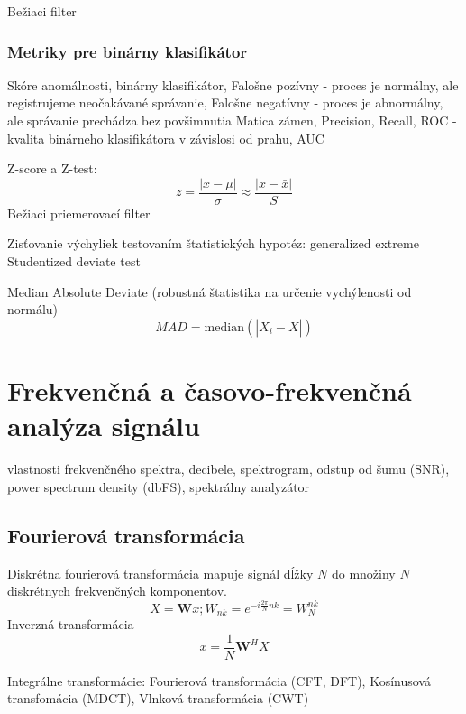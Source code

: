 Bežiaci filter  
\cite{anomaly-detection-models}

\subsubsection{Metriky pre binárny klasifikátor}
Skóre anomálnosti, 	binárny klasifikátor, 
Falošne pozívny - proces je normálny, ale registrujeme neočakávané správanie, 
Falošne negatívny - proces je abnormálny, ale správanie prechádza bez povšimnutia
Matica zámen, Precision, Recall, 
ROC - kvalita binárneho klasifikátora v závislosi od prahu, AUC
\cite{wsn-outlier-detection-survey}

Z-score a Z-test: 
\begin{equation}
z = \frac{|x - \mu|}{\sigma} \approx \frac{|x - \bar{x}|}{S}
\end{equation}
Bežiaci priemerovací filter \cite{anomaly-detection-models}

Zisťovanie výchyliek testovaním štatistických hypotéz: 
generalized extreme Studentized deviate test \cite{generalized-esd} 

Median Absolute Deviate (robustná štatistika na určenie vychýlenosti od normálu)
\begin{equation}
MAD = \mathrm{median}(|X_i - \bar{X}|)
\end{equation}


\section{Frekvenčná a časovo-frekvenčná analýza signálu}
vlastnosti frekvenčného spektra, decibele, spektrogram, odstup od šumu (SNR), power spectrum density (dbFS), spektrálny analyzátor 

\subsection{Fourierová transformácia}
Diskrétna fourierová transformácia mapuje signál dĺžky $N$ do množiny $N$ diskrétnych frekvenčných komponentov. \cite{signal-processing}
\begin{equation}
X = \mathbf{W}x; W_{nk} = e^{-i\frac{2\pi}{N}nk} = W_N^{nk}
\end{equation}
Inverzná transformácia
\begin{equation}
x = \frac{1}{N}\mathbf{W}^H X
\end{equation}

Integrálne transformácie: Fourierová transformácia (CFT, DFT), Kosínusová transfomácia (MDCT), Vlnková transformácia (CWT) \cite{dct} \cite{casove-frekvencia-analyza-signalu}

